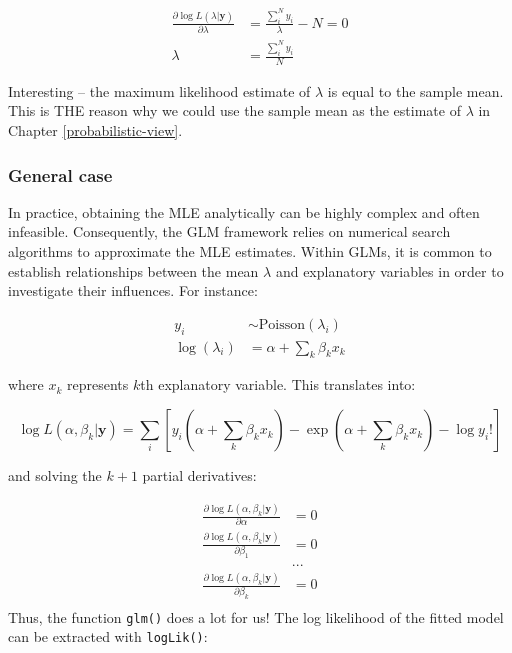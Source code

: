 \documentclass[
]{article}
\begin{document}
\[
\begin{aligned}
\frac{\partial\log L(\lambda|\pmb{y})}{\partial \lambda} &= \frac{\sum_i^N y_i}{\lambda} - N = 0\\
\lambda &= \frac{\sum_i^N y_i}{N} 
\end{aligned}
\]

Interesting -- the maximum likelihood estimate of \(\lambda\) is equal to the sample mean. This is THE reason why we could use the sample mean as the estimate of \(\lambda\) in Chapter \ref{probabilistic-view}.

\hypertarget{general-case}{%
\subsubsection{General case}\label{general-case}}

In practice, obtaining the MLE analytically can be highly complex and often infeasible. Consequently, the GLM framework relies on numerical search algorithms to approximate the MLE estimates. Within GLMs, it is common to establish relationships between the mean \(\lambda\) and explanatory variables in order to investigate their influences. For instance:

\[
\begin{aligned}
y_i &\sim \mbox{Poisson}(\lambda_i)\\
\log(\lambda_i) &= \alpha + \sum_k \beta_k x_k
\end{aligned}
\]

where \(x_k\) represents \(k\)th explanatory variable. This translates into:

\[
\log L(\alpha, \beta_k|\pmb{y}) = \sum_i \left[y_i (\alpha + \sum_k\beta_k x_k) - \exp(\alpha + \sum_k \beta_k x_k) - \log y_i! \right]
\]

and solving the \(k+1\) partial derivatives:

\[
\begin{aligned}
\frac{\partial \log L(\alpha, \beta_k|\pmb{y})}{\partial \alpha} &= 0\\
\frac{\partial \log L(\alpha, \beta_k|\pmb{y})}{\partial \beta_1} &= 0\\
&...\\
\frac{\partial \log L(\alpha, \beta_k|\pmb{y})}{\partial \beta_k} &= 0\\
\end{aligned}
\]Thus, the function \texttt{glm()} does a lot for us! The log likelihood of the fitted model can be extracted with \texttt{logLik()}:
\end{document}
